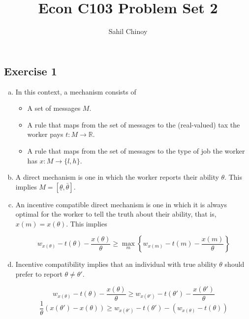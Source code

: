 \documentclass{article}
\title{Econ C103 Problem Set 2}
\author{Sahil Chinoy}
\begin{document}
\maketitle{}

\subsection*{Exercise 1}

\begin{enumerate}[(a)]

	\item

	In this context, a mechanism consists of

	\begin{itemize}

		\item A set of messages $M$.

		\item A rule that maps from the set of messages to the (real-valued) tax the worker pays $t: M \rightarrow \mathbb{R}$.

		\item A rule that maps from the set of messages to the type of job the worker has $x: M \rightarrow \{l,h\}$.

	\end{itemize}

	\item

	A direct mechanism is one in which the worker reports their ability $\theta$. This implies $M = [\underline{\theta}, \bar{\theta}]$.

	\item

	An incentive compatible direct mechanism is one in which it is always optimal for the worker to tell the truth about their ability, that is, $x(m) = x(\theta)$. This implies

	\begin{equation*}
	w_{x(\theta)} - t(\theta) - \frac{x(\theta)}{
	\theta} \geq \max_m \left \{ w_{x(m)} - t(m) - \frac{x(m)}{\theta} \right \}
	\end{equation*}

	\item

	Incentive compatibility implies that an individual with true ability $\theta$ should prefer to report $\theta \neq \theta'$.

	\begin{equation*}
	w_{x(\theta)} - t(\theta) - \frac{x(\theta)}{
	\theta} \geq w_{x(\theta')} - t(\theta') - \frac{x(\theta')}{
	\theta}
	\end{equation*}
	\begin{equation}
	\frac{1}{\theta} (x(\theta') - x(\theta)) \geq w_{x(\theta')} - t(\theta') - (w_{x(\theta)} - t(\theta))
	\end{equation}


\end{enumerate}
\end{document}
